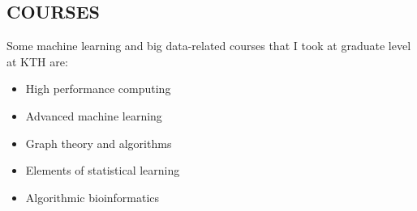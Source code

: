 \documentclass[margin, 10pt]{res} %
\begin{document}
\begin{resume}

\section{COURSES}

Some machine learning and big data-related courses that I took at graduate level at KTH are:
\begin{itemize}
\item High performance computing
\item Advanced machine learning
\item Graph theory and algorithms
\item Elements of statistical learning
\item Algorithmic bioinformatics
\end{itemize} 



\end{resume}
\end{document}
